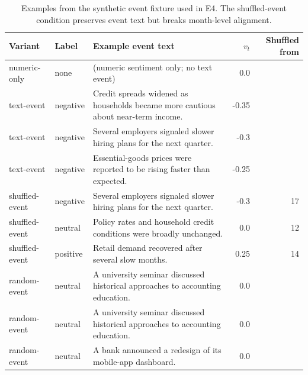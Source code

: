 \ifdefined\FinEvoAllowHistoricalPrePZeroEvidence\else
{}
\fi
\begin{table}[t]
\centering
\scriptsize
\setlength{\tabcolsep}{3pt}
\begin{tabular}{llp{}rr}
\toprule
Variant & Label & Example event text & $v_t$ & Shuffled from \\
\midrule
numeric-only & none & (numeric sentiment only; no text event) & 0.0 &  \\
text-event & negative & Credit spreads widened as households became more cautious about near-term income. & -0.35 &  \\
text-event & negative & Several employers signaled slower hiring plans for the next quarter. & -0.3 &  \\
text-event & negative & Essential-goods prices were reported to be rising faster than expected. & -0.25 &  \\
shuffled-event & negative & Several employers signaled slower hiring plans for the next quarter. & -0.3 & 17 \\
shuffled-event & neutral & Policy rates and household credit conditions were broadly unchanged. & 0.0 & 12 \\
shuffled-event & positive & Retail demand recovered after several slow months. & 0.25 & 14 \\
random-event & neutral & A university seminar discussed historical approaches to accounting education. & 0.0 &  \\
random-event & neutral & A university seminar discussed historical approaches to accounting education. & 0.0 &  \\
random-event & neutral & A bank announced a redesign of its mobile-app dashboard. & 0.0 &  \\
\bottomrule
\end{tabular}
\caption{Examples from the synthetic event fixture used in E4.  The shuffled-event condition preserves event text but breaks month-level alignment.}
\label{tab:e4_event_fixture_examples}
\end{table}
